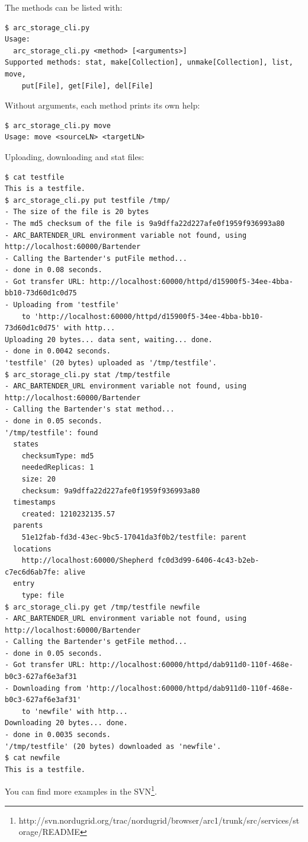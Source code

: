 \documentclass{book}
\begin{document}
The methods can be listed with:
\begin{verbatim}
$ arc_storage_cli.py
Usage:
  arc_storage_cli.py <method> [<arguments>]
Supported methods: stat, make[Collection], unmake[Collection], list, move,
    put[File], get[File], del[File]
\end{verbatim}
Without arguments, each method prints its own help:
\begin{verbatim}
$ arc_storage_cli.py move
Usage: move <sourceLN> <targetLN>
\end{verbatim}

Uploading, downloading and stat files:

\begin{verbatim}
$ cat testfile 
This is a testfile.
$ arc_storage_cli.py put testfile /tmp/
- The size of the file is 20 bytes
- The md5 checksum of the file is 9a9dffa22d227afe0f1959f936993a80
- ARC_BARTENDER_URL environment variable not found, using http://localhost:60000/Bartender
- Calling the Bartender's putFile method...
- done in 0.08 seconds.
- Got transfer URL: http://localhost:60000/httpd/d15900f5-34ee-4bba-bb10-73d60d1c0d75
- Uploading from 'testfile'
    to 'http://localhost:60000/httpd/d15900f5-34ee-4bba-bb10-73d60d1c0d75' with http...
Uploading 20 bytes... data sent, waiting... done.
- done in 0.0042 seconds.
'testfile' (20 bytes) uploaded as '/tmp/testfile'.
$ arc_storage_cli.py stat /tmp/testfile
- ARC_BARTENDER_URL environment variable not found, using http://localhost:60000/Bartender
- Calling the Bartender's stat method...
- done in 0.05 seconds.
'/tmp/testfile': found
  states
    checksumType: md5
    neededReplicas: 1
    size: 20
    checksum: 9a9dffa22d227afe0f1959f936993a80
  timestamps
    created: 1210232135.57
  parents
    51e12fab-fd3d-43ec-9bc5-17041da3f0b2/testfile: parent
  locations
    http://localhost:60000/Shepherd fc0d3d99-6406-4c43-b2eb-c7ec6d6ab7fe: alive
  entry
    type: file
$ arc_storage_cli.py get /tmp/testfile newfile
- ARC_BARTENDER_URL environment variable not found, using http://localhost:60000/Bartender
- Calling the Bartender's getFile method...
- done in 0.05 seconds.
- Got transfer URL: http://localhost:60000/httpd/dab911d0-110f-468e-b0c3-627af6e3af31
- Downloading from 'http://localhost:60000/httpd/dab911d0-110f-468e-b0c3-627af6e3af31'
    to 'newfile' with http...
Downloading 20 bytes... done.
- done in 0.0035 seconds.
'/tmp/testfile' (20 bytes) downloaded as 'newfile'.
$ cat newfile 
This is a testfile.
\end{verbatim}

You can find more examples in the SVN\footnote{http://svn.nordugrid.org/trac/nordugrid/browser/arc1/trunk/src/services/storage/README}.
\end{document}
